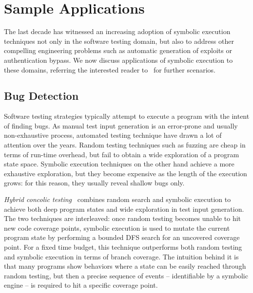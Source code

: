 
\section{Sample Applications}
\label{se:applications}

The last decade has witnessed an increasing adoption of symbolic execution techniques not only in the software testing domain, but also to address other compelling engineering problems such as automatic generation of exploits or authentication bypass. We now discuss  applications of symbolic execution to these domains, referring the interested reader to~\cite{CGK-ICSE11} for further scenarios.

\subsection{Bug Detection}
\label{ss:bug-detection}

Software testing strategies typically attempt to execute a program with the intent of finding bugs. As manual test input generation is an error-prone and usually non-exhaustive process, automated testing technique have drawn a lot of attention over the years. Random testing techniques such as fuzzing are cheap in terms of run-time overhead, but fail to obtain a wide exploration of a program state space. Symbolic execution techniques on the other hand achieve a more exhaustive exploration, but they become expensive as the length of the execution grows: for this reason, they usually reveal shallow bugs only.

{\em Hybrid concolic testing}~\cite{RK-ICSE07} combines random search and symbolic execution to achieve both deep program states and wide exploration in test input generation. The two techniques are interleaved: once random testing becomes unable to hit new code coverage points, symbolic execution is used to mutate the current program state by performing a bounded DFS search for an uncovered coverage point. For a fixed time budget, this technique outperforms both random testing and symbolic execution in terms of branch coverage. The intuition behind it is that many programs show behaviors where a state can be easily reached through random testing, but then a precise sequence of events -- identifiable by a symbolic engine -- is required to hit a specific coverage point.

